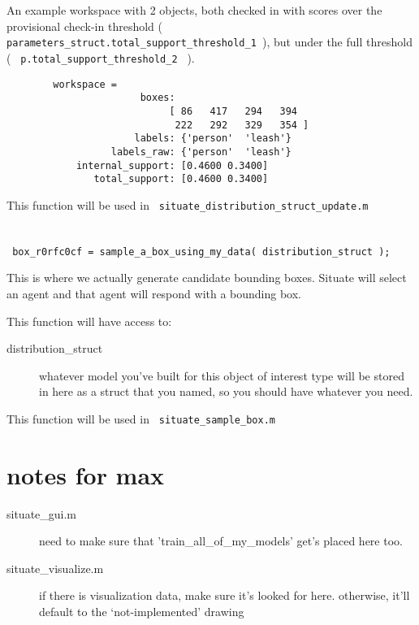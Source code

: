 \documentclass[11pt]{article}
\begin{document}
		An example workspace with 2 objects, both checked in with scores over the provisional check-in threshold (\verb| parameters_struct.total_support_threshold_1 |), but under the full threshold ( \verb| p.total_support_threshold_2 | ).

\begin{verbatim}
		workspace = 
		               boxes: 
               			    [ 86   417   294   394
               			     222   292   329   354 ]
		              labels: {'person'  'leash'}
		          labels_raw: {'person'  'leash'}
		    internal_support: [0.4600 0.3400]
		       total_support: [0.4600 0.3400]
 \end{verbatim}


	This function will be used in \verb| situate_distribution_struct_update.m |




\section{}

\verb| box_r0rfc0cf = sample_a_box_using_my_data( distribution_struct ); |

	This is where we actually generate candidate bounding boxes. Situate will select an agent and that agent will respond with a bounding box.

	This function will have access to:
	\begin{description}
\item[		distribution\_struct]
			whatever model you've built for this object of interest type will be stored in here as a struct that you named, so you should have whatever you need.
\end{description}


	This function will be used in \verb| situate_sample_box.m |
	



\section*{notes for max}

	\begin{description}
\item[situate\_gui.m]
		need to make sure  that 'train\_all\_of\_my\_models' get's placed here too.

	\item[situate\_visualize.m]
		if there is visualization data, make sure it's looked for here. otherwise, it'll default to the `not-implemented' drawing
\end{description}
\end{document}
